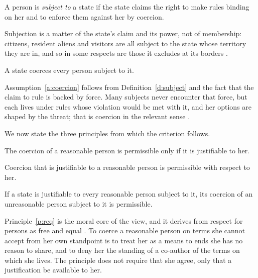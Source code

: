 \documentclass{situationist-preprint}
\begin{document}
\begin{definition}[Subjection]\label{d:subject}
A person is \emph{subject to} a state if the state claims the right to make rules binding on her and to enforce them against her by coercion.
\end{definition}

Subjection is a matter of the state's claim and its power, not of membership: citizens, resident aliens and visitors are all subject to the state whose territory they are in, and so in some respects are those it excludes at its borders \citep{Abizadeh2008}.

\begin{assumption}[Coercion]\label{a:coercion}
A state coerces every person subject to it.
\end{assumption}

Assumption~\ref{a:coercion} follows from Definition~\ref{d:subject} and the fact that the claim to rule is backed by force. Many subjects never encounter that force, but each lives under rules whose violation would be met with it, and her options are shaped by the threat; that is coercion in the relevant sense \citep{Ripstein2009}.

We now state the three principles from which the criterion follows.

\begin{principle}\label{p:req}
The coercion of a reasonable person is permissible only if it is justifiable to her.
\end{principle}

\begin{principle}[Sufficiency]\label{p:suff}
Coercion that is justifiable to a reasonable person is permissible with respect to her.
\end{principle}

\begin{principle}\label{p:unreas}
If a state is justifiable to every reasonable person subject to it, its coercion of an unreasonable person subject to it is permissible.
\end{principle}

Principle~\ref{p:req} is the moral core of the view, and it derives from respect for persons as free and equal \citep{Larmore1999}. To coerce a reasonable person on terms she cannot accept from her own standpoint is to treat her as a means to ends she has no reason to share, and to deny her the standing of a co-author of the terms on which she lives. The principle does not require that she agree, only that a justification be available to her.
\end{document}
